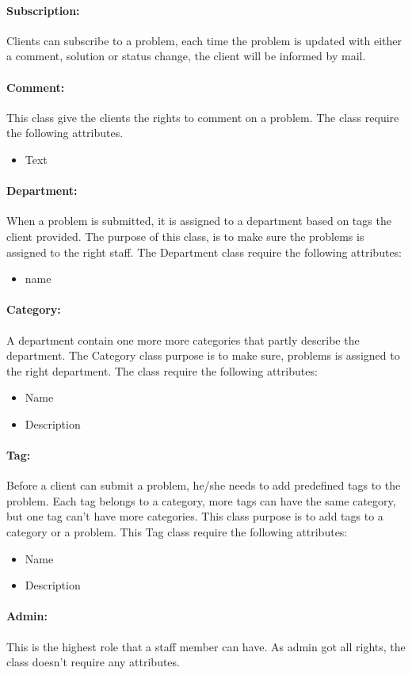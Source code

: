  \paragraph{Subscription:}Clients can subscribe to a problem, each time the problem is updated with either a comment, solution or status change, the client will be informed by mail.

 \paragraph{Comment:}This class give the clients the rights to comment on a problem. The class require the following attributes.
\begin{itemize}
 \item{Text}
\end{itemize}
 
  \paragraph{Department:}When a problem is submitted, it is assigned to a department based on tags the client provided. The purpose of this class, is to make sure the problems is assigned to the right staff. The Department class require the following attributes:
\begin{itemize}
 \item{name}
\end{itemize}

 \paragraph{Category:}A department contain one more more categories that partly describe the department. The Category class purpose is to make sure, problems is assigned to the right department. The class require the following attributes:
\begin{itemize}
 \item{Name}
 \item{Description}
\end{itemize}
 
 \paragraph{Tag:}Before a client can submit a problem, he/she needs to add predefined tags to the problem. Each tag belongs to a category, more tags can have the same category, but one tag can't have more categories. This class purpose is to add tags to a category or a problem. This Tag class require the following attributes:
\begin{itemize}
 \item{Name}
 \item{Description}
\end{itemize}

 \paragraph{Admin:}This is the highest role that a staff member can have. As admin got all rights, the class doesn't require any attributes.
